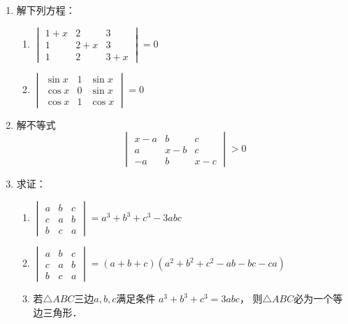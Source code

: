 \begin{enumerate}
\item 解下列方程：
\begin{multicols}{2}
\begin{enumerate}
    \item $\begin{vmatrix}
        1+x&2&3\\1&2+x&3\\1&2&3+x
    \end{vmatrix}=0$
    \item $\begin{vmatrix}
        \sin x&1&\sin x\\ \cos x&0&\sin x\\ \cos x&1&\cos x
    \end{vmatrix}=0$
\end{enumerate}
\end{multicols}

\item 解不等式
\[\begin{vmatrix}
    x-a&b&c\\a&x-b&c\\-a&b&x-c
\end{vmatrix}>0\]

\item 求证：
\begin{enumerate}
    \item $\begin{vmatrix}
        a&b&c\\c&a&b\\b&c&a
    \end{vmatrix}=a^3+b^3+c^3-3abc$
    \item $\begin{vmatrix}
        a&b&c\\c&a&b\\b&c&a
    \end{vmatrix}=(a+b+c)(a^2+b^2+c^2-ab-bc-ca)$
    \item 若$\triangle ABC$三边$a,b,c$满足条件
    $a^3+b^3+c^3=3abc$，
    则$\triangle ABC$必为一个等边三角形．
\end{enumerate}


\end{enumerate}
